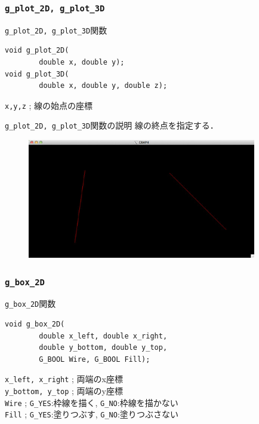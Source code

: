\documentclass[platex,a4paper,12pt]{jsarticle}%
\begin{document}
\subsubsection{\texttt{g\_plot\_2D, g\_plot\_3D}}

\begin{itembox}[l]{\texttt{g\_plot\_2D, g\_plot\_3D}関数}
\begin{verbatim}
void g_plot_2D(
        double x, double y);
void g_plot_3D(
        double x, double y, double z);     
\end{verbatim}
\verb|x,y,z| ; 線の始点の座標\\
\end{itembox}

\begin{itembox}[l]{\texttt{g\_plot\_2D, g\_plot\_3D}関数の説明}
線の終点を指定する．
\end{itembox}

\begin{figure}[htb]
\centering
\includegraphics[width=100mm]{Canvas_g_move_g_plot.eps}
\end{figure}


\clearpage
\subsubsection{\texttt{g\_box\_2D}}

\begin{itembox}[l]{\texttt{g\_box\_2D}関数}
\begin{verbatim}
void g_box_2D(
        double x_left, double x_right,
        double y_bottom, double y_top,
        G_BOOL Wire, G_BOOL Fill);    
\end{verbatim}
\verb|x_left, x_right| ; 両端のx座標\\
\verb|y_bottom, y_top| ; 両端のy座標\\
\verb|Wire| ; \verb|G_YES|:枠線を描く, \verb|G_NO|:枠線を描かない \\
\verb|Fill| ; \verb|G_YES|:塗りつぶす, \verb|G_NO|:塗りつぶさない
\end{itembox}
\end{document}
